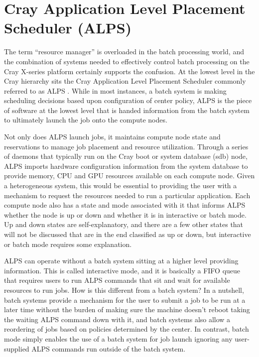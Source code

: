 \section{Cray Application Level Placement Scheduler (ALPS)}

The term ``resource manager'' is overloaded in the batch processing world, and
the combination of systems needed to effectively control batch processing on
the Cray X-series platform certainly supports the confusion.  At the lowest
level in the Cray hierarchy sits the Cray Application Level Placement Scheduler
commonly referred to as ALPS \cite{alps}.  While in most instances, a batch
system is making scheduling decisions based upon configuration of center
policy, ALPS is the piece of software at the lowest level that is handed
information from the batch system to ultimately launch the job onto the compute
nodes.

Not only does ALPS launch jobs, it maintains compute node state and
reservations to manage job placement and resource utilization.  Through a
series of daemons that typically run on the Cray boot or system database (sdb)
node, ALPS imports hardware configuration information from the system database
to provide memory, CPU and GPU resources available on each compute node.  Given
a heterogeneous system, this would be essential to providing the user with a
mechanism to request the resources needed to run a particular application.
Each compute node also has a state and mode associated with it that informs
ALPS whether the node is up or down and whether it is in interactive or batch
mode.  Up and down states are self-explanatory, and there are a few other
states that will not be discussed that are in the end classified as up or down,
but interactive or batch mode requires some explanation.  

ALPS can operate without a batch system sitting at a higher level providing
information.  This is called interactive mode, and it is basically a FIFO queue
that requires users to run ALPS commands that sit and wait for available
resources to run jobs.  How is this different from a batch system?  In a
nutshell, batch systems provide a mechanism for the user to submit a job to be
run at a later time without the burden of making sure the machine doesn't
reboot taking the waiting ALPS command down with it, and batch systems also
allow a reordering of jobs based on policies determined by the center.  In
contrast, batch mode simply enables the use of a batch system for job launch
ignoring any user-supplied ALPS commands run outside of the batch system.

